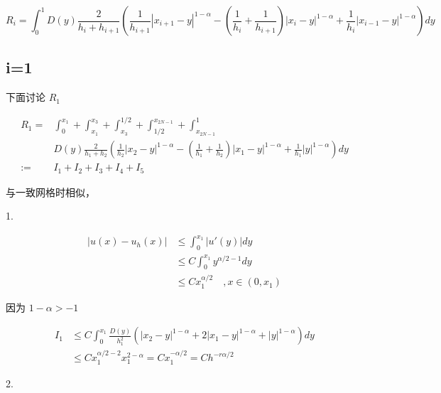 \documentclass{ctexart}
\begin{document}
\begin{equation}
    R_i = \int_0^1 D(y) \frac{2}{h_i + h_{i+1}} 
    ( \frac{1}{h_{i+1}} |x_{i+1}-y|^{1-\alpha} 
    - (\frac{1}{h_{i}}+\frac{1}{h_{i+1}}) |x_{i}-y|^{1-\alpha}
    +  \frac{1}{h_{i}}|x_{i-1}-y|^{1-\alpha} )  dy 
\end{equation}

\subsection{i=1}

下面讨论 \(R_1\)

\begin{equation}
    \begin{aligned}
        R_1 =& \int_0^{x_1} + \int_{x_1}^{x_3} + \int_{x_3}^{1/2} + \int_{1/2}^{x_{2N-1}} + \int_{x_{2N-1}}^1  \\
        & D(y) \frac{2}{h_1 + h_{2}} 
        ( \frac{1}{h_{2}} |x_{2}-y|^{1-\alpha} 
        - (\frac{1}{h_{1}}+\frac{1}{h_{2}}) |x_{1}-y|^{1-\alpha}
        +  \frac{1}{h_{1}}|y|^{1-\alpha} )  dy \\
        := & I_1 + I_2 + I_3 + I_4 + I_5
    \end{aligned}
\end{equation}

与一致网格时相似，

1. 

\begin{equation}
    \begin{aligned}
        |u(x) - u_h(x)| &\le \int_0^{x_1} |u'(y)| dy    \\
        &\le C \int_0^{x_1} y^{\alpha/2-1} dy   \\
        &\le C x_1^{\alpha/2}    \quad , x\in (0, x_1)
    \end{aligned}
\end{equation}

因为 \(1-\alpha > -1\)

\begin{equation}
    \begin{aligned}
        I_1 & \le C \int_0^{x_1} \frac{D(y)}{h_1^2} 
        ( |x_{2}-y|^{1-\alpha} 
        +2 |x_{1}-y|^{1-\alpha}
        +|y|^{1-\alpha} )  dy       \\
        &\le C  x_1^{\alpha/2-2} x_1^{2-\alpha} = C x_1^{-\alpha/2} = C h^{-r\alpha/2}
    \end{aligned}
\end{equation}

2.
\end{document}
